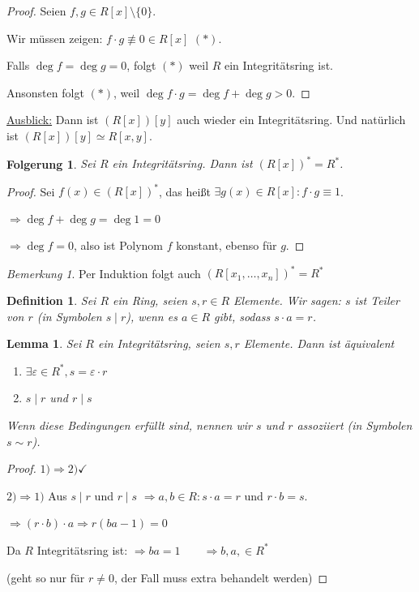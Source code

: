 \documentclass[a4paper,12pt,numbers=noenddot,parskip=full]{scrartcl}
\newcommand{\heading}{\underline}
\theoremstyle{dotless}
\newtheorem{corollary}[theorem]{Folgerung}
\newtheorem{lemma}[theorem]{Lemma}
\newtheorem{definition}[theorem]{Definition}
\theoremstyle{remark}
\newtheorem*{remark}{Bemerkung}
\begin{document}
 	\begin{proof}
 		Seien $f,g \in R[x] \setminus \{0\}$.
 		
 		Wir müssen zeigen: $f \cdot g \not\equiv 0 \in R[x]$ $(*)$.
 		
 		Falls $\deg f = \deg g = 0$, folgt $(*)$ weil $R$ ein Integritätsring ist.
 		
 		Ansonsten folgt $(*)$, weil $\deg f \cdot g = \deg f + \deg g > 0$.
 	\end{proof}
 
 	\heading{Ausblick:} Dann ist $(R[x])[y]$ auch wieder ein Integritätsring. Und natürlich ist $(R[x])[y] \simeq R[x,y]$.
 	
 	\begin{corollary}
 		Sei $R$ ein Integritätsring. Dann ist $(R[x])^* = R^*$.
 	\end{corollary}
 
 	\begin{proof}
 		Sei $f(x) \in (R[x])^*$, das heißt $\exists g(x) \in R[x]: f \cdot g \equiv 1$.
 		
 		$\Rightarrow \deg f + \deg g = \deg 1 = 0$
 		
 		$\Rightarrow \deg f = 0$, also ist Polynom $f$ konstant, ebenso für $g$. 
 	\end{proof}
 
 	\begin{remark}
 		Per Induktion folgt auch $(R[x_1, \dots, x_n])^* = R^*$
 	\end{remark}
 
 	\begin{definition}
 		Sei $R$ ein Ring, seien $s, r \in R$ Elemente. Wir sagen: $s$ ist Teiler von $r$ (in Symbolen $s \mid r$), wenn es $a \in R$ gibt, sodass $s \cdot a = r$.
 	\end{definition}
 
 	\begin{lemma}
 		Sei $R$ ein Integritätsring, seien $s,r$ Elemente. Dann ist äquivalent
 		\begin{enumerate}
 			\item $\exists \varepsilon \in R^*, s = \varepsilon \cdot r$
 			\item $s \mid r$ und $r \mid s$
 		\end{enumerate}
 	
 	Wenn diese Bedingungen erfüllt sind, nennen wir $s$ und $r$ assoziiert (in Symbolen $s \sim r$).
 	\end{lemma}
 
 	\begin{proof}
 		$1) \Rightarrow 2) \checkmark$
 		
 		$2) \Rightarrow 1)$ Aus $s \mid r$ und $r \mid s$ $\Rightarrow a,b \in R: s \cdot a = r$ und $r \cdot b = s$.
 		
 		$\Rightarrow (r \cdot b) \cdot a \Rightarrow r(ba - 1) = 0$
 		
 		Da $R$ Integritätsring ist: $\Rightarrow ba = 1 \qquad \Rightarrow b,a, \in R^*$
 		
 		(geht so nur für $r \neq 0$, der Fall muss extra behandelt werden)
 	\end{proof}
 
\end{document}
